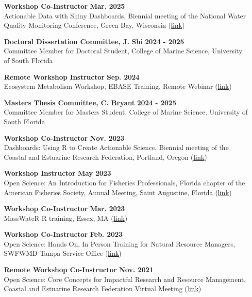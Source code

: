 \documentclass[letterpaper,12pt]{article}
\begin{document}
{\bf Workshop Co-Instructor} \hfill {\bf Mar. 2025}\\
Actionable Data with Shiny Dashboards, Biennial meeting of the National Water Quality Monitoring Conference, Green Bay, Wisconsin ({\footnotesize\href{https://tbep-tech.github.io/nwqmc-shiny/}{link}})

{\bf Doctoral Dissertation Committee, J. Shi} \hfill {\bf 2024 - 2025} \\
Committee Member for Doctoral Student, College of Marine Science, University of South Florida

{\bf Remote Workshop Instructor} \hfill {\bf Sep. 2024}\\
Ecosystem Metabolism Workshop, EBASE Training, Remote Webinar ({\footnotesize\href{https://fawda123.github.io/ebase-training/}{link}})

{\bf Masters Thesis Committee, C. Bryant} \hfill {\bf 2024 - 2025} \\
Committee Member for Masters Student, College of Marine Science, University of South Florida

{\bf Workshop Co-Instructor} \hfill {\bf Nov. 2023}\\
Dashboards: Using R to Create Actionable Science, Biennial meeting of the Coastal and Estuarine Research Federation, Portland, Oregon ({\footnotesize\href{https://tbep-tech.github.io/shiny-workshop/}{link}})

{\bf Workshop Instructor} \hfill {\bf May 2023}\\
Open Science: An Introduction for Fisheries Professionals, Florida chapter of the American Fisheries Society, Annual Meeting, Saint Augustine, Florida ({\footnotesize\href{https://tbep-tech.github.io/flafs-os-workshop/}{link}})

{\bf Workshop Co-Instructor} \hfill {\bf Mar. 2023}\\
MassWateR R training, Essex, MA ({\footnotesize\href{https://massbays-tech.github.io/intro-to-r/}{link}})

{\bf Workshop Co-Instructor} \hfill {\bf Feb. 2023}\\
Open Science: Hands On, In Person Training for Natural Resource Managers, SWFWMD Tampa Service Office ({\footnotesize\href{https://tbep-tech.github.io/tbep-os-workshop/}{link}})

{\bf Remote Workshop Co-Instructor} \hfill {\bf Nov. 2021}\\
Open Science: Core Concepts for Impactful Research and Resource Management, Coastal and Estuarine Research Federation Virtual Meeting ({\footnotesize\href{https://tbep-tech.github.io/cerf-os-workshop/}{link}})
\end{document}
